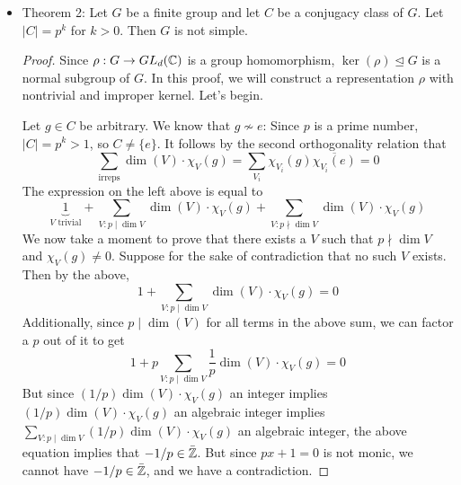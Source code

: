 \documentclass[../notes.tex]{subfiles}
\begin{document}
\begin{itemize}
    \item Theorem 2: Let $G$ be a finite group and let $C$ be a conjugacy class of $G$. Let $|C|=p^k$ for $k>0$. Then $G$ is not simple.
    \begin{proof}
        Since $\rho:G\to GL_d(\mathbb{C})$ is a group homomorphism, $\ker(\rho)\trianglelefteq G$ is a normal subgroup of $G$. In this proof, we will construct a representation $\rho$ with nontrivial and improper kernel. Let's begin.\par
        Let $g\in C$ be arbitrary. We know that $g\nsim e$: Since $p$ is a prime number, $|C|=p^k>1$, so $C\neq\{e\}$. It follows by the second orthogonality relation that
        \begin{equation*}
            \sum_\text{irreps}\dim(V)\cdot\chi_V(g) = \sum_{V_i}\chi_{V_i}(g)\overline{\chi_{V_i}(e)}
            = 0
        \end{equation*}
        The expression on the left above is equal to
        \begin{equation*}
            \underbrace{1}_{V\text{ trivial}}+\sum_{V:p\mid\dim V}\dim(V)\cdot\chi_V(g)+\sum_{V:p\nmid\dim V}\dim(V)\cdot\chi_V(g)
        \end{equation*}
        We now take a moment to prove that there exists a $V$ such that $p\nmid\dim V$ and $\chi_V(g)\neq 0$. Suppose for the sake of contradiction that no such $V$ exists. Then by the above,
        \begin{equation*}
            1+\sum_{V:p\mid\dim V}\dim(V)\cdot\chi_V(g) = 0
        \end{equation*}
        Additionally, since $p\mid\dim(V)$ for all terms in the above sum, we can factor a $p$ out of it to get
        \begin{equation*}
            1+p\sum_{V:p\mid\dim V}\frac{1}{p}\dim(V)\cdot\chi_V(g) = 0
        \end{equation*}
        But since $(1/p)\dim(V)\cdot\chi_V(g)$ an integer implies $(1/p)\dim(V)\cdot\chi_V(g)$ an algebraic integer implies $\sum_{V:p\mid\dim V}(1/p)\dim(V)\cdot\chi_V(g)$ an algebraic integer, the above equation implies that $-1/p\in\bar{\mathbb{Z}}$. But since $px+1=0$ is not monic, we cannot have $-1/p\in\bar{\mathbb{Z}}$, and we have a contradiction.\par

\end{proof}
\end{itemize}
\end{document}
